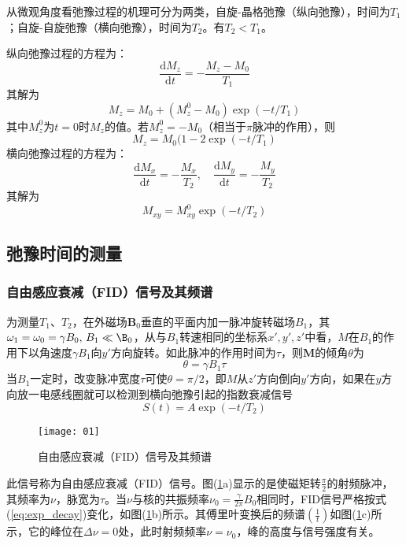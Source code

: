 \documentclass[aps,pre,12pt,preprint,onecolumn,showpacs,showkeys]{revtex4-1}
\def \d {\mathrm d}
\begin{document}
        从微观角度看弛豫过程的机理可分为两类，自旋-晶格弛豫（纵向弛豫），时间为$T_1$；自旋-自旋弛豫（横向弛豫），时间为$T_2$。有$T_2<T_1$。

        纵向弛豫过程的方程为：
        \begin{equation}
            \frac{\d M_z}{\d t}=-\frac{M_z-M_0}{T_1}
        \end{equation}
        其解为
        \begin{equation}
            M_z=M_0+(M_z^0-M_0)\exp(-t/T_1)
        \end{equation}
        其中$M_z^0$为$t=0$时$M_z$的值。若$M_z^0=-M_0$（相当于$\pi$脉冲的作用），则
        \begin{equation}
            M_z=M_0(1-2\exp(-t/T_1)\label{eq:T1}
        \end{equation}
        横向弛豫过程的方程为：
        \begin{equation}
            \frac{\d M_x}{\d t}=-\frac{M_x}{T_2},\quad \frac{\d M_y}{\d t}=-\frac{M_y}{T_2}
        \end{equation}
        其解为
        \begin{equation}
            M_{xy}=M_{xy}^0\exp(-t/T_2)\label{eq:T2}
        \end{equation}

    \subsection{弛豫时间的测量}
        \subsubsection{自由感应衰减（FID）信号及其频谱}
            为测量$T_1$、$T_2$，在外磁场$\bm B_0$垂直的平面内加一脉冲旋转磁场$B_1$，其$\omega_1=\omega_0=\gamma B_0,\, B_1\ll\B_0$，从与$B_1$转速相同的坐标系$x',y',z'$中看，$M$在$B_1$的作用下以角速度$\gamma B_1$向$y'$方向旋转。如此脉冲的作用时间为$\tau$，则$\bm M$的倾角$\theta$为
            \begin{equation}
                \theta=\gamma B_1 \tau
            \end{equation}
            当$B_1$一定时，改变脉冲宽度$\tau$可使$\theta=\pi/2$，即$M$从$z'$方向倒向$y'$方向，如果在$y$方向放一电感线圈就可以检测到横向弛豫引起的指数衰减信号
            \begin{equation}
                S(t)=A\exp(-t/T_2)\label{eq:exp_decay}
            \end{equation}
            \begin{figure}[ht]
                \centering
                \texttt{[image: 01]}
                \caption{\label{fig:FID}%
                自由感应衰减（FID）信号及其频谱}
            \end{figure}
            此信号称为自由感应衰减（FID）信号。图(\ref{fig:FID}a)显示的是使磁矩转$\frac{\pi}{2}$的射频脉冲，其频率为$\nu$，脉宽为$\tau$。当$\nu$与核的共振频率$\nu_0=\frac{\gamma}{2\pi}B_0$相同时，FID信号严格按式(\ref{eq:exp_decay})变化，如图(\ref{fig:FID}b)所示。其傅里叶变换后的频谱$\left(\frac{1}{t}\right)$如图(\ref{fig:FID}c)所示，它的峰位在$\Delta \nu=0$处，此时射频频率$\nu=\nu_0$，峰的高度与信号强度有关。
\end{document}
